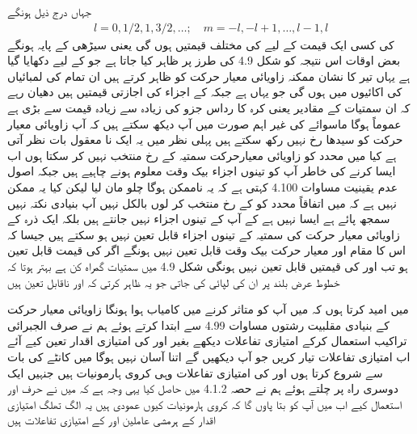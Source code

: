 جہاں درج ذیل ہونگے 
\begin{align}
l = 0, 1/2, 1, 3/2, \dotsc ; \quad m = - l, - l + 1, \dotsc , l - 1, l
\end{align}
 کی کسی ایک قیمت کے لیے  کی  مختلف قیمتیں ہوں گی یعنی سیڑھی کے  پایہ ہونگے بعض اوقات اس نتیجہ کو شکل 4.9 کی طرز پر ظاہر کیا جاتا ہے جو  کے لیے دکھایا گیا ہے یہاں تیر کا نشان ممکنہ زاویائی  معیار حرکت کو ظاہر کرتے ہیں ان تمام کی لمبائیاں   کی اکائیوں میں  ہوں گی جو یہاں  ہے جبکہ  کے  اجزاء  کی اجازتی قیمتیں  ہیں دھیان رہے کہ ان سمتيات کے مقادیر یعنی کرہ کا رداس  جزو کی زیادہ سے زیادہ قیمت سے بڑی ہے عموماً  ہوگا ماسوائے  کی غیر اہم صورت میں آپ دیکھ سکتے ہیں کہ آپ زاویائی معیار حرکت کو سیدھا   رخ نہیں رکھ سکتے ہیں پہلی نظر میں یہ ایک نا معقول بات نظر آتی ہے کیا میں  محدد کو زاویائی معیارحرکت سمتیہ کے رخ منتخب نہیں کر سکتا ہوں اب ایسا کرنے کی خاطر آپ کو تینوں اجزاء بیک وقت معلوم ہونے چاہیے ہیں جبکہ اصول عدم یقینیت مساوات 4.100 کہتی ہے کہ یہ ناممکن ہوگا چلو مان لیا لیکن کیا یہ ممکن نہیں ہے کہ میں اتفاقاً   محدد کو  کے رخ منتخب  کر  لوں   بالکل نہیں آپ بنیادی نکتہ نہیں سمجھ پائے ہے ایسا نہیں ہے کے آپ  کے تینوں اجزاء نہیں جانتے ہیں بلکہ ایک ذرہ  کے زاویائی معیار حرکت کی سمتیہ کے تینوں اجزاء قابل تعین نہیں ہو سکتے ہیں جیسا کہ اس کا مقام اور معیار حرکت بیک وقت قابل تعین نہیں ہونگے اگر  کی قیمت قابل تعین ہو تب  اور  کی قیمتیں قابل تعین نہیں ہونگی شکل 4.9 میں سمتیات گمراہ کن ہے بہتر ہوتا کہ خطوط عرض بلند پر  ان کی لپائی کی جاتی جو یہ ظاہر کرتی کہ  اور  ناقابل تعین ہیں

 میں امید کرتا ہوں کہ میں آپ کو متاثر کرنے میں کامیاب ہوا ہونگا زاویائی معیار حرکت کے بنیادی مقلبیت رشتوں   مساوات 4.99 سے ابتدا کرتے ہوئے ہم نے صرف الجبرائی تراکیب استعمال کرکے امتیازی تفاعلات دیکھے بغیر  اور  کی امتیازی اقدار تعین کیے آئے اب امتیازی تفاعلات تیار کریں جو آپ دیکھیں گے اتنا آسان نہیں ہوگا میں کانٹے کی بات سے شروع کرتا ہوں   اور  کی امتیازی تفاعلات وہی کروی ہارمونیات ہیں جنہیں ایک دوسری راہ پر چلتے ہوئے ہم نے حصہ 4.1.2 میں حاصل کیا یہی وجہ ہے کہ میں نے حرف  اور  استعمال کیے اب میں آپ کو بتا پاوں گا کہ کروی ہارمونیات کیوں عمودی ہیں یہ الگ تھلگ امتیازی اقدار کے ہرمشی عاملین  اور  کے امتیازی تفاعلات ہیں 

